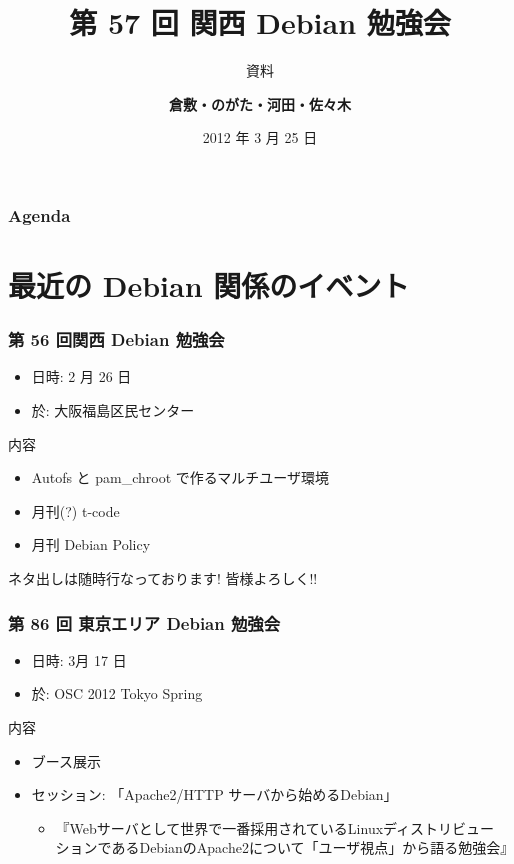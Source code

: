 \documentclass[cjk,dvipdfmx,12pt,%
hyperref={bookmarks=true,bookmarksnumbered=true,bookmarksopen=false,%
colorlinks=false,%
pdftitle={第 57 回 関西 Debian 勉強会},%
pdfauthor={倉敷・のがた・河田・佐々木},%
pdfsubject={資料},%
}]{beamer}
\title{第 57 回 関西 Debian 勉強会}
\subtitle{{\scriptsize 資料}}
\author[佐々木 洋平]{{\large\bf 倉敷・のがた・河田・佐々木}}
\institute[Debian JP]{{\normalsize\tt 関西 Debian 勉強会}}
\date{{\small 2012 年 3 月 25 日}}
\begin{document}
\settitleslide
\begin{frame}
\titlepage
\end{frame}
\setdefaultslide

\begin{frame}[fragile]
\frametitle{Agenda}

\tableofcontents

\end{frame}

\section{最近の Debian 関係のイベント}



\begin{frame}[fragile]
\frametitle{第 56 回関西 Debian 勉強会}

\begin{itemize}
\item 日時: 2 月 26 日
\item 於: 大阪福島区民センター
\end{itemize}

\begin{block}{内容}
  \begin{itemize}
  \item Autofs と pam\_chroot で作るマルチユーザ環境
  \item 月刊(?) t-code
  \item 月刊 Debian Policy
  \end{itemize}
\end{block}
ネタ出しは随時行なっております! 皆様よろしく!!
\end{frame}

\begin{frame}[fragile]
  \frametitle{第 86 回 東京エリア Debian 勉強会}
  \begin{itemize}
  \item  日時: 3月 17 日
  \item 於: OSC 2012 Tokyo Spring
  \end{itemize}
  \begin{block}{内容}
    \begin{itemize}
    \item ブース展示
    \item セッション: 「Apache2/HTTP サーバから始めるDebian」
      \begin{itemize}
      \item 『Webサーバとして世界で一番採用されているLinuxディストリビュー
        ションであるDebianのApache2について「ユーザ視点」から語る勉強会』
      \end{itemize}
    \end{itemize}
  \end{block}
\end{frame}
\end{document}
